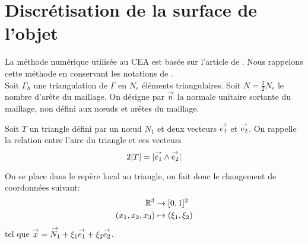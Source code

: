 \section{Discrétisation de la surface de l'objet}

  La méthode numérique utilisée au CEA  est basée sur l'article de \cite{medgyesi-mitschang_integral_1985}. Nous rappelons cette méthode en conservant les notations de \cite{stupfel_implementation_2015}.\\

  Soit \(\Gamma_h\) une triangulation de \(\Gamma\) en \(N_e\) éléments triangulaires. Soit \(N=\frac{3}{2}N_e\) le nombre d'arête du maillage. On désigne par \(\vn\) la normale unitaire sortante du maillage, non défini aux nœuds et arêtes du maillage.

  Soit \(T\) un triangle défini par un nœud \(N_1\) et deux vecteurs \(\vect{e_1}\) et \(\vect{e_2}\). On rappelle la relation entre l'aire du triangle et ces vecteurs
  \begin{equation*}
    2|T| = |\vect{e_1}\pvect\vect{e_2}|
  \end{equation*}

  \newcommand{\ncouche}{6}
  \newcommand{\setnodes}[6]{
      \renewcommand{\xa}{#1}
      \renewcommand{\ya}{#2}
      \renewcommand{\xb}{#3}
      \renewcommand{\yb}{#4}
      \renewcommand{\xc}{#5}
      \renewcommand{\yc}{#6}
  }
  \newcommand{\xa}{0.0}
  \newcommand{\ya}{0.0}
  \newcommand{\xb}{3.0}
  \newcommand{\yb}{0.0}
  \newcommand{\xc}{0.0}
  \newcommand{\yc}{3.0}
    \begin{center}
      \begin{tikzpicture}[scale=1]
        
      \end{tikzpicture}
    \end{center}
    \label{fig:form_int:fon_base:tri}

  On se place dans le repère local au triangle, on fait donc le changement de coordonnées suivant:
  \begin{align*}
    \RR^3 &\rightarrow [0,1]^2 \\
    (x_1,x_2,x_3) & \mapsto (\xi_1,\xi_2)
  \end{align*}
    tel que \(\vx =\vect{N_1}+ \xi_1 \vect{e_1} + \xi_2 \vect{e_2}\).

